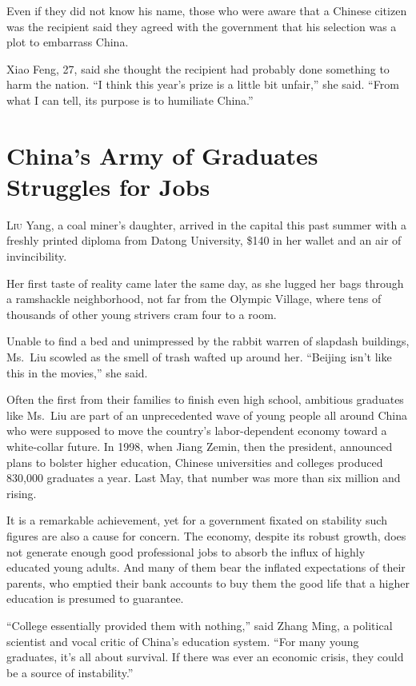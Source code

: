 ﻿\documentclass[12pt]{article}
\begin{document}
Even if they did not know his name, those who were aware that a Chinese citizen was the recipient
said they agreed with the government that his selection was a plot to embarrass China.

Xiao Feng, 27, said she thought the recipient had probably done something to harm the nation. ``I
think this year's prize is a little bit unfair,'' she said. ``From what I can tell, its purpose is
to humiliate China.''

\section{China's Army of Graduates Struggles for Jobs}

\lettrine{L}{iu} Yang, a coal miner's daughter, arrived in the capital this
past summer with a freshly printed diploma from Datong University, \$140 in her wallet and an air of
invincibility.

Her first taste of reality came later the same day, as she lugged her bags through a ramshackle
neighborhood, not far from the Olympic Village, where tens of thousands of other young strivers cram
four to a room.

Unable to find a bed and unimpressed by the rabbit warren of slapdash buildings, Ms.~Liu scowled as
the smell of trash wafted up around her. ``Beijing isn't like this in the movies,'' she said.

Often the first from their families to finish even high school, ambitious graduates like Ms.~Liu are
part of an unprecedented wave of young people all around China who were supposed to move the
country's labor-dependent economy toward a white-collar future. In 1998, when Jiang Zemin, then the
president, announced plans to bolster higher education, Chinese universities and colleges produced
830,000 graduates a year. Last May, that number was more than six million and rising.

It is a remarkable achievement, yet for a government fixated on stability such figures are also a
cause for concern. The economy, despite its robust growth, does not generate enough good
professional jobs to absorb the influx of highly educated young adults. And many of them bear the
inflated expectations of their parents, who emptied their bank accounts to buy them the good life
that a higher education is presumed to guarantee.

``College essentially provided them with nothing,'' said Zhang Ming, a political scientist and vocal
critic of China's education system. ``For many young graduates, it's all about survival. If there
was ever an economic crisis, they could be a source of instability.''
\end{document}
